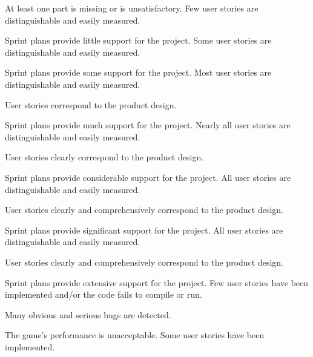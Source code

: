 \documentclass{../../fal_assignment}
\begin{document}
\rubricyearthree
\begin{markingrubric}
		\grade\fail At least one part is missing or is unsatisfactory.
%
        \grade \fail Few user stories are distinguishable and easily measured.
            \par Sprint plans provide little support for the project.
        \grade Some user stories are distinguishable and easily measured.
            \par Sprint plans provide some support for the project.
        \grade Most user stories are distinguishable and easily measured.
            \par User stories correspond to the product design.
            \par Sprint plans provide much support for the project.
        \grade Nearly all user stories are distinguishable and easily measured.
            \par User stories clearly correspond to the product design.
            \par Sprint plans provide considerable support for the project.
        \grade All user stories are distinguishable and easily measured.
            \par User stories clearly and comprehensively correspond to the product design.
            \par Sprint plans provide significant support for the project.
        \grade All user stories are distinguishable and easily measured.
            \par User stories clearly and comprehensively correspond to the product design.
            \par Sprint plans provide extensive support for the project.
%
        \grade \fail Few user stories have been implemented  and/or the code fails to compile or run.
            \par Many obvious and serious bugs are detected.
            \par The game's performance is unacceptable.
        \grade Some user stories have been implemented.

\end{markingrubric}
\end{document}
